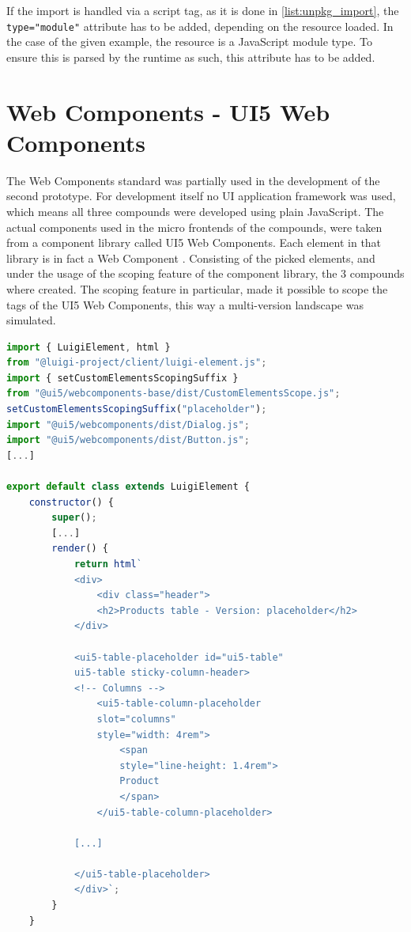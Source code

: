If the import is handled via a script tag, as it is done in \ref{list:unpkg_import}, the \texttt{type="module"} attribute has to be added, depending on the resource loaded.
In the case of the given example, the resource is a JavaScript module type. To ensure this is parsed by the runtime as such, this attribute has to be added.\cite{js_module_type}

\section{Web Components - UI5 Web Components} 

The Web Components standard was partially used in the development of the second prototype. For development itself no UI application framework was used, which means all three compounds were developed using plain JavaScript. The actual components used in the micro frontends of the compounds, were taken from a component library called UI5 Web Components. Each element in that library is in fact a Web Component \cite{ui5_wc_github}.
Consisting of the picked elements, and under the usage of the scoping feature of the component library, the 3 compounds where created. The scoping feature in particular, made it possible to scope the tags of the UI5 Web Components, this way a multi-version landscape was simulated.\cite{ui5_webcomponents_scoping}

\begin{lstlisting}[language=JavaScript,caption=Scoping feature used in the prototype, label=list:scoping_wc_prototype,  xleftmargin=.0\textwidth, xrightmargin=.0\textwidth]
import { LuigiElement, html } 
from "@luigi-project/client/luigi-element.js";
import { setCustomElementsScopingSuffix } 
from "@ui5/webcomponents-base/dist/CustomElementsScope.js";
setCustomElementsScopingSuffix("placeholder");
import "@ui5/webcomponents/dist/Dialog.js";
import "@ui5/webcomponents/dist/Button.js";
[...]

export default class extends LuigiElement {
	constructor() {
		super();
		[...]
		render() {
			return html`
			<div>
				<div class="header">
				<h2>Products table - Version: placeholder</h2>
			</div>
			
			<ui5-table-placeholder id="ui5-table" 
			ui5-table sticky-column-header>
			<!-- Columns -->
				<ui5-table-column-placeholder 
				slot="columns" 
				style="width: 4rem">
					<span 
					style="line-height: 1.4rem">
					Product
					</span>
				</ui5-table-column-placeholder>
			
			[...]
			
			</ui5-table-placeholder>
			</div>`;
		}
	}
\end{lstlisting}
	
